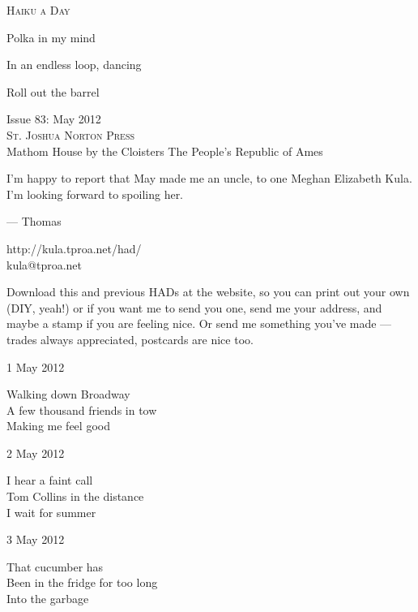 \documentclass[12pt]{article}
\begin{document}
\begin{center}
{\fontsize{36}{48}\selectfont \textsc{Haiku a Day }}
\end{center}

\vspace*{3.5cm}

{\fontsize{20}{40}\selectfont 

Polka in my mind 

In an endless loop, dancing 

Roll out the barrel


}

\vspace*{5.0cm}
\begin{center}
{\large{Issue 83: May 2012}} \\[5mm]
{\fontsize{8}{8}\selectfont  \textsc{ St. Joshua Norton Press }} \\[1mm]
{\fontsize{6}{6}\selectfont Mathom House by the Cloisters \textbar The People's Republic of Ames }
\end{center}


\newpage

I'm happy to report that May made me an uncle, to one
Meghan Elizabeth Kula. I'm looking forward to spoiling
her.

--- Thomas

http://kula.tproa.net/had/ \\
kula@tproa.net

Download this and previous HADs at the website, so you can
print out your own (DIY, yeah!) or if you want me to send
you one, send me your address, and maybe a stamp if you
are feeling nice. Or send me something you've made ---
trades always appreciated, postcards are nice too.

\vfill

1 May 2012

Walking down Broadway \\
A few thousand friends in tow \\
Making me feel good

2 May 2012

I hear a faint call \\
Tom Collins in the distance \\
I wait for summer

3 May 2012

That cucumber has \\
Been in the fridge for too long \\
Into the garbage

\newpage
\end{document}
